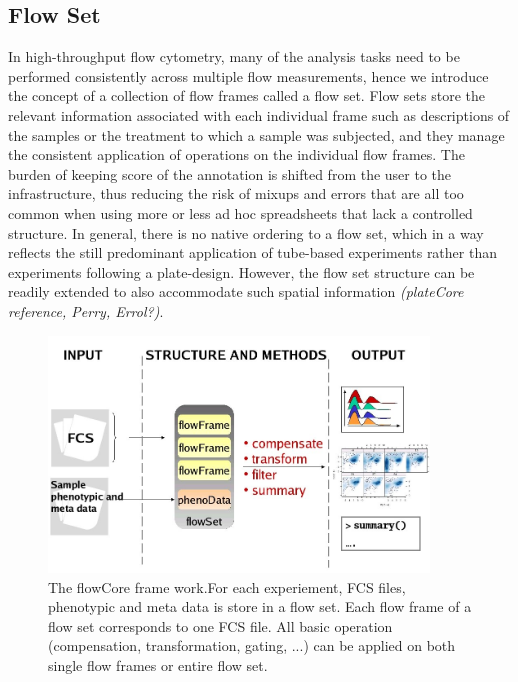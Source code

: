 \documentclass[12pt]{article}
\begin{document}
\subsection*{Flow Set}
In high-throughput flow cytometry, many of the analysis tasks need to
be performed consistently across multiple flow measurements, hence we
introduce the concept of a collection of flow frames called a flow
set. Flow sets store the relevant information associated with each
individual frame such as descriptions of the samples or the treatment
to which a sample was subjected, and they manage the consistent
application of operations on the individual flow frames. The burden of
keeping score of the annotation is shifted from the user to the
infrastructure, thus reducing the risk of mixups and errors that are
all too common when using more or less ad hoc spreadsheets that lack a
controlled structure. In general, there is no native ordering to a
flow set, which in a way reflects the still predominant application of
tube-based experiments rather than experiments following a
plate-design. However, the flow set structure can be readily extended
to also accommodate such spatial information \textit{(plateCore
  reference, Perry, Errol?)}.

\begin{figure}
\centering
\includegraphics[width=0.9\textwidth]{Figure1-flowCoreFrameWork.jpg}
\caption{\label{fig1:FrameWork}{The flowCore frame work.For each
    experiement, FCS files, phenotypic and meta data is store in a
    flow set. Each flow frame of a flow set corresponds to one FCS
    file. All basic operation (compensation, transformation, gating,
    ...) can be applied on both single flow frames or entire flow
    set.}}
\end{figure}
\end{document}
